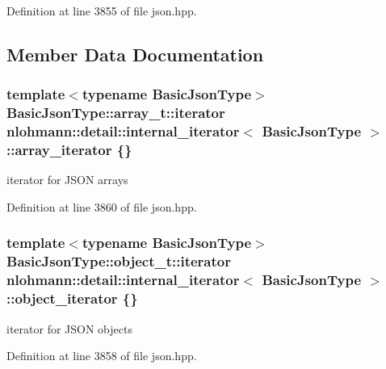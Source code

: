 Definition at line 3855 of file json.\+hpp.



\subsection{Member Data Documentation}
\subsubsection[{\texorpdfstring{array\+\_\+iterator}{array_iterator}}]{\setlength{\rightskip}{0pt plus 5cm}template$<$typename Basic\+Json\+Type$>$ Basic\+Json\+Type\+::array\+\_\+t\+::iterator {\bf nlohmann\+::detail\+::internal\+\_\+iterator}$<$ Basic\+Json\+Type $>$\+::array\+\_\+iterator \{\}}\hypertarget{structnlohmann_1_1detail_1_1internal__iterator_a8294a6e6f01b58e1cce8fbae66a50b5d}{}\label{structnlohmann_1_1detail_1_1internal__iterator_a8294a6e6f01b58e1cce8fbae66a50b5d}


iterator for J\+S\+ON arrays 



Definition at line 3860 of file json.\+hpp.

\subsubsection[{\texorpdfstring{object\+\_\+iterator}{object_iterator}}]{\setlength{\rightskip}{0pt plus 5cm}template$<$typename Basic\+Json\+Type$>$ Basic\+Json\+Type\+::object\+\_\+t\+::iterator {\bf nlohmann\+::detail\+::internal\+\_\+iterator}$<$ Basic\+Json\+Type $>$\+::object\+\_\+iterator \{\}}\hypertarget{structnlohmann_1_1detail_1_1internal__iterator_a8cb0af3498061426c1d0a65ad6220408}{}\label{structnlohmann_1_1detail_1_1internal__iterator_a8cb0af3498061426c1d0a65ad6220408}


iterator for J\+S\+ON objects 



Definition at line 3858 of file json.\+hpp.

